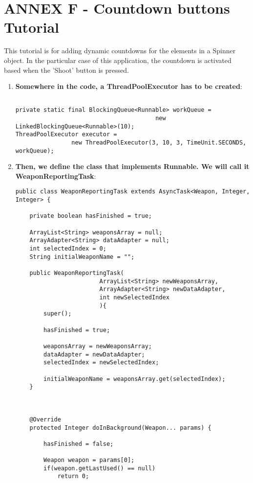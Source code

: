 \section{ANNEX F - Countdown buttons Tutorial}

This tutorial is for adding dynamic countdowns for the elements in a Spinner
object. In the particular case of this application, the countdown is activated
based when the 'Shoot' button is pressed.\newline
\begin{enumerate}
  \item \textbf{Somewhere in the code, a ThreadPoolExecutor has to be created}:
  
\begin{verbatim}

private static final BlockingQueue<Runnable> workQueue = 
										new LinkedBlockingQueue<Runnable>(10);
ThreadPoolExecutor executor = 
				new ThreadPoolExecutor(3, 10, 3, TimeUnit.SECONDS, workQueue);
\end{verbatim}
	
  \item \textbf{Then, we define the class that implements Runnable. We will call
  it WeaponReportingTask}:

\begin{verbatim}
public class WeaponReportingTask extends AsyncTask<Weapon, Integer, Integer> {	
  		
	private boolean hasFinished = true;
	
	ArrayList<String> weaponsArray = null;
	ArrayAdapter<String> dataAdapter = null;
	int selectedIndex = 0;
	String initialWeaponName = "";	
	
	public WeaponReportingTask(
						ArrayList<String> newWeaponsArray, 
						ArrayAdapter<String> newDataAdapter,
						int newSelectedIndex
						){		
		super();
		
		hasFinished = true;
		
		weaponsArray = newWeaponsArray;
		dataAdapter = newDataAdapter;
		selectedIndex = newSelectedIndex;
		
		initialWeaponName = weaponsArray.get(selectedIndex);
	}
	
	

	@Override
 	protected Integer doInBackground(Weapon... params) {
	
		hasFinished = false;
		
		Weapon weapon = params[0];
 		if(weapon.getLastUsed() == null) 
 			return 0;
 		

\end{verbatim}
\end{enumerate}
